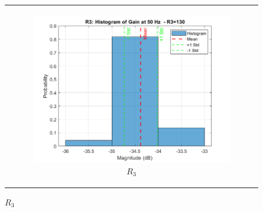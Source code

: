 \documentclass[hidelinks,12pt]{article}
\begin{document}
\begin{figure}[!h]
{\begin{tabular}{c}
\begin{subfigure}[h]{0.4\textwidth}
					\centering
					\includegraphics[width=\textwidth]{figures/r3=130/r3.png}
					\caption{$R_3$}
				\end{subfigure} \\
				

\end{tabular}}
\end{figure}
\end{document}
